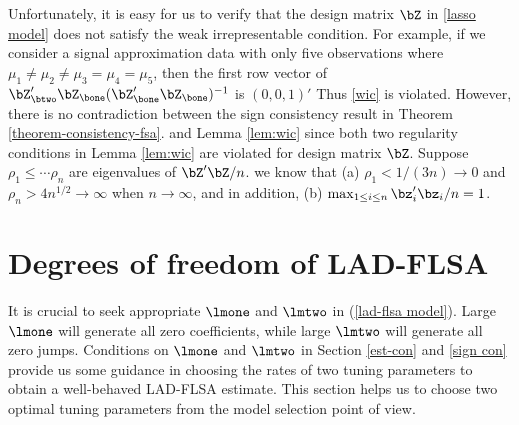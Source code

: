 \documentclass[12pt]{article}
\begin{document}
Unfortunately, it is easy for us to verify that
the design matrix $\bZ$ in \eqref{lasso model}
 does not satisfy the weak irrepresentable condition.
For example, if we consider a signal approximation data with only five observations where
$\mu_1\neq\mu_2\neq\mu_3=\mu_4=\mu_5$, then the first row vector of
$\bZ'_{\btwo}\bZ_{\bone}(\bZ'_{\bone}\bZ_{\bone})^{-1}$ is $(0,0,1)'$
Thus \eqref{wic} is violated.
However, there is no contradiction between the sign consistency result in Theorem  \ref{theorem-consistency-fsa}.
and Lemma \ref{lem:wic} since both two regularity conditions
in Lemma \ref{lem:wic} are violated for design matrix $\bZ$.
Suppose $\rho_1\le \cdots \rho_n$ are eigenvalues of $\bZ'\bZ/n$.
we know that (a) $\rho_1<1/(3n)\to 0$ and $\rho_n>4n^{1/2}\to \infty$ when $n\to \infty$, and in addition,
(b)  $\max_{1\le i\le n} \bz_i'\bz_i/n =1$.



\section{ Degrees of freedom of LAD-FLSA}\label{GDF}
It is crucial to seek appropriate $\lmone$ and $\lmtwo$
in (\ref{lad-flsa model}).
Large $\lmone$ will generate all zero coefficients, while large $\lmtwo$ will generate all zero jumps.
 Conditions on $\lmone$ and $\lmtwo$ in Section \ref{est-con} and \ref{sign con}
 provide us some guidance   in choosing
 the rates of two tuning parameters to obtain a
 well-behaved LAD-FLSA estimate. This section helps
 us to choose two optimal tuning parameters from the model selection point of view.
\end{document}
